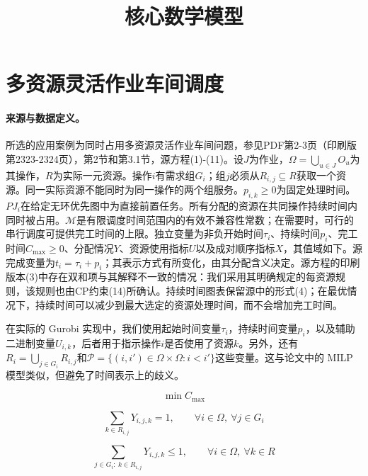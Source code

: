 \documentclass{article}
\title{核心数学模型}
\date{}
\begin{document}
\maketitle

\section*{多资源灵活作业车间调度}

\paragraph{来源与数据定义。}
所选的应用案例为同时占用多资源灵活作业车间问题，参见PDF第2-3页（印刷版第2323-2324页），第2节和第3.1节，源方程(1)-(11)。设$J$为作业，$\Omega=\bigcup_{u\in J}O_u$为其操作，$R$为实际一元资源。操作$i$有需求组$G_i$；组$j$必须从$R_{i,j}\subseteq R$获取一个资源。同一实际资源不能同时为同一操作的两个组服务。$p_{i,k}\ge0$为固定处理时间。$PJ_i$在给定无环优先图中为直接前置任务。所有分配的资源在共同操作持续时间内同时被占用。$\mathcal M$是有限调度时间范围内的有效不兼容性常数；在需要时，可行的串行调度可提供完工时间的上限。独立变量为非负开始时间$\tau_i$、持续时间$p_i$、完工时间$C_{\max}\ge0$、分配情况$Y$、资源使用指标$U$以及成对顺序指标$X$，其值域如下。源完成变量为$t_i=\tau_i+p_i$；其表示方式有所变化，由其分配含义决定。源方程的印刷版本(3)中存在双和项与其解释不一致的情况：我们采用其明确规定的每资源规则，该规则也由CP约束(14)所确认。持续时间图表保留源中的形式(4)；在最优情况下，持续时间可以减少到最大选定的资源处理时间，而不会增加完工时间。


在实际的 Gurobi 实现中，我们使用起始时间变量$\tau_i$，持续时间变量$p_i$，以及辅助二进制变量$U_{i,k}$，后者用于指示操作$i$是否使用了资源$k$。另外，还有$R_i = \bigcup_{j \in G_i} R_{i,j}$和$\mathcal{P} = \{(i,i') \in \Omega \times \Omega : i < i'\}$这些变量。这与论文中的 MILP 模型类似，但避免了时间表示上的歧义。

\begin{equation}
\min C_{\max}
\tag{1}
\end{equation}

\begin{equation}
\sum_{k \in R_{i,j}} Y_{i,j,k} = 1,
\qquad
\forall i \in \Omega,\ \forall j \in G_i
\tag{2}
\end{equation}

\begin{equation}
\sum_{j \in G_i:\ k \in R_{i,j}} Y_{i,j,k} \le 1,
\qquad
\forall i \in \Omega,\ \forall k \in R
\tag{3}
\end{equation}
\end{document}
